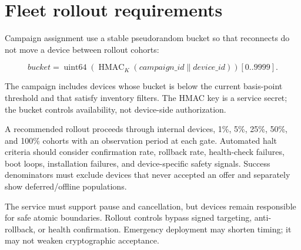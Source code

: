 \section{Fleet rollout requirements}

Campaign assignment \should use a stable pseudorandom bucket so that reconnects
do not move a device between rollout cohorts:

\[
  \textit{bucket} =
  \operatorname{uint64}(\operatorname{HMAC}_{K}
  (\textit{campaign\_id} \parallel \textit{device\_id}))[0..9999].
\]

The campaign includes devices whose bucket is below the current basis-point
threshold and that satisfy inventory filters. The HMAC key is a service secret;
the bucket controls availability, not device-side authorization.

A recommended rollout proceeds through internal devices, 1\%, 5\%, 25\%, 50\%,
and 100\% cohorts with an observation period at each gate. Automated halt criteria
should consider confirmation rate, rollback rate, health-check failures, boot
loops, installation failures, and device-specific safety signals. Success
denominators must exclude devices that never accepted an offer and separately
show deferred/offline populations.

The service must support pause and cancellation, but devices remain responsible
for safe atomic boundaries. Rollout controls \mustnot bypass signed targeting,
anti-rollback, or health confirmation. Emergency deployment may shorten timing;
it may not weaken cryptographic acceptance.

